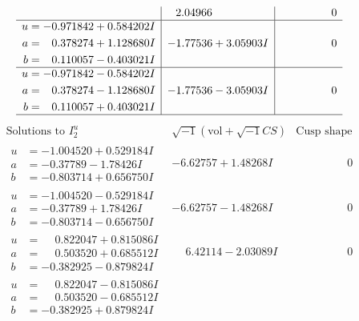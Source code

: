 \documentclass[1p]{elsarticle_modified}
\theoremstyle{definition}
\newcommand{\I}{\sqrt{-1}}
\begin{document}
$$\begin{array}{c|c|c}
 & \phantom{-}2.04966\phantom{ +0.000000I} & \phantom{-0.000000 } 0 \\ \hline\begin{aligned}
u &= -0.971842 + 0.584202 I \\
a &= \phantom{-}0.378274 + 1.128680 I \\
b &= \phantom{-}0.110057 - 0.403021 I\end{aligned}
 & -1.77536 + 3.05903 I & \phantom{-0.000000 } 0 \\ \hline\begin{aligned}
u &= -0.971842 - 0.584202 I \\
a &= \phantom{-}0.378274 - 1.128680 I \\
b &= \phantom{-}0.110057 + 0.403021 I\end{aligned}
 & -1.77536 - 3.05903 I & \phantom{-0.000000 } 0\\
 \hline 
 \end{array}$$\newpage$$\begin{array}{c|c|c}  
\text{Solutions to }I^u_{2}& \I (\text{vol} + \sqrt{-1}CS) & \text{Cusp shape}\\
 \hline 
\begin{aligned}
u &= -1.004520 + 0.529184 I \\
a &= -0.37789 - 1.78426 I \\
b &= -0.803714 + 0.656750 I\end{aligned}
 & -6.62757 + 1.48268 I & \phantom{-0.000000 } 0 \\ \hline\begin{aligned}
u &= -1.004520 - 0.529184 I \\
a &= -0.37789 + 1.78426 I \\
b &= -0.803714 - 0.656750 I\end{aligned}
 & -6.62757 - 1.48268 I & \phantom{-0.000000 } 0 \\ \hline\begin{aligned}
u &= \phantom{-}0.822047 + 0.815086 I \\
a &= \phantom{-}0.503520 + 0.685512 I \\
b &= -0.382925 - 0.879824 I\end{aligned}
 & \phantom{-}6.42114 - 2.03089 I & \phantom{-0.000000 } 0 \\ \hline\begin{aligned}
u &= \phantom{-}0.822047 - 0.815086 I \\
a &= \phantom{-}0.503520 - 0.685512 I \\
b &= -0.382925 + 0.879824 I\end{aligned}

\end{array}$$
\end{document}
